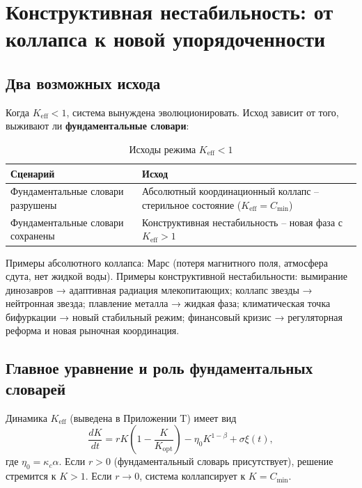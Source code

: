 \documentclass[12pt,a4paper]{article}
\newcommand{\Keff}{K_{\mathrm{eff}}}
\begin{document}
	\section{Конструктивная нестабильность: от коллапса к новой упорядоченности}
	
	\subsection{Два возможных исхода}
	
	Когда $\Keff < 1$, система вынуждена эволюционировать. Исход зависит от того,
	выживают ли \textbf{фундаментальные словари}:
	
	\begin{table}[H]
		\centering
		\caption{Исходы режима $\Keff < 1$}
		\begin{tabular}{p{5cm}p{8cm}}
			\toprule
			\textbf{Сценарий} & \textbf{Исход} \\
			\midrule
			Фундаментальные словари разрушены & Абсолютный координационный коллапс – стерильное состояние ($\Keff = C_{\min}$) \\
			Фундаментальные словари сохранены & Конструктивная нестабильность – новая фаза с $\Keff > 1$ \\
			\bottomrule
		\end{tabular}
	\end{table}
	
	Примеры абсолютного коллапса: Марс (потеря магнитного поля, атмосфера сдута,
	нет жидкой воды). Примеры конструктивной нестабильности: вымирание динозавров →
	адаптивная радиация млекопитающих; коллапс звезды → нейтронная звезда; плавление металла →
	жидкая фаза; климатическая точка бифуркации → новый стабильный режим; финансовый кризис →
	регуляторная реформа и новая рыночная координация.
	
	\subsection{Главное уравнение и роль фундаментальных словарей}
	
	Динамика $\Keff$ (выведена в Приложении T) имеет вид
	\begin{equation}
		\frac{dK}{dt} = r K\left(1 - \frac{K}{K_{\mathrm{opt}}}\right) - \eta_0 K^{1-\beta} + \sigma \xi(t),
		\label{eq:master}
	\end{equation}
	где $\eta_0 = \kappa_c \alpha$. Если $r > 0$ (фундаментальный словарь присутствует),
	решение стремится к $K > 1$. Если $r \to 0$, система коллапсирует к $K = C_{\min}$.
	
\end{document}
